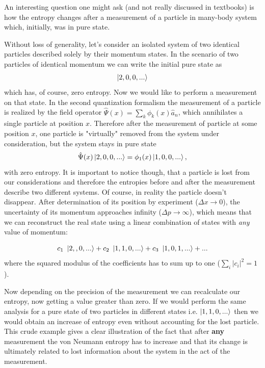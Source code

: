 \documentclass[a4paper,12pt]{article}
\begin{document}
An interesting question one might ask (and not really discussed in textbooks) is how the entropy changes after a measurement of a particle in many-body system which, initially, was in pure state.

Without loss of generality, let's consider an isolated system of two identical particles described solely by their momentum states.
In the scenario of two particles of identical momentum we can write the initial pure state as 
\begin{equation}
  \ket{2,0,0,...}
\end{equation}
which has, of course, zero entropy. Now we would like to perform a measurement on that state. 
In the second quantization formalism the measurement of a particle is realized by the field operator $ \hat{\Psi}(x) =\sum_k \phi_k(x)\hat{a}_n$, which annihilates a single particle at position $x$.
Therefore after the measurement of particle at some position $x$, one particle is "virtually" removed from the system under consideration, but the system stays in pure state
\begin{equation}
  \hat{\Psi}(x)\ket{2,0,0,...}=\phi_1(x)\ket{1,0,0,...},
\end{equation}
with zero entropy. It is important to notice though, that a particle is lost from our considerations and therefore the entropies before and after the measurement describe two different systems. Of course, in reality the particle doesn't disappear. After determination of its position by experiment ($\Delta x \to 0$), the uncertainty of its momentum approaches infinity ($\Delta p \to \infty$), which means that we can reconstruct the real state using a linear combination of states with \textit{any} value of momentum:

\begin{equation}
  c_1\ \ket{2,,0,...}+c_2\ \ket{1,1,0,...}+  c_3\ \ket{1,0,1,...}+...
\end{equation}
where the  squared modulus of the coefficients has to sum up to one ($ \sum_i \left| c_i \right|^2 = 1 $).

Now depending on the precision of the measurement we can recalculate our entropy, now getting a value greater than zero. If we would perform the same analysis for a pure state of two particles in different states i.e. $\ket{1,1,0,...}$ then we would obtain an increase of entropy even without accounting for the lost particle.
This crude example gives a clear illustration of the fact that after \textbf{any} measurement the von Neumann entropy has to increase and that its change is ultimately related to lost information about the system in the act of the measurement.
\end{document}
